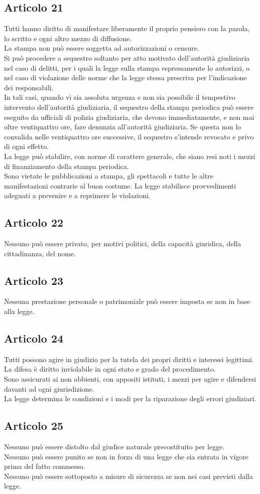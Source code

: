 \documentclass{article}
\newcommand{\articolo}[1]{
	\subsection*{Articolo #1}
}
\begin{document}
\articolo{21}
Tutti hanno diritto di manifestare liberamente il proprio pensiero con la parola, lo scritto e ogni altro mezzo di diffusione.\\
La stampa non può essere soggetta ad autorizzazioni o censure.\\
Si può procedere a sequestro soltanto per atto motivato dell’autorità giudiziaria nel caso di delitti, per i quali la legge sulla stampa espressamente lo autorizzi, o nel caso di violazione delle norme che la legge stessa prescriva per l’indicazione dei responsabili.\\
In tali casi, quando vi sia assoluta urgenza e non sia possibile il tempestivo intervento dell’autorità giudiziaria, il sequestro della stampa periodica può essere eseguito da ufficiali di polizia giudiziaria, che devono immediatamente, e non mai oltre ventiquattro ore, fare denunzia all’autorità giudiziaria. Se questa non lo convalida nelle ventiquattro ore successive, il sequestro s’intende revocato e privo di ogni effetto.\\
La legge può stabilire, con norme di carattere generale, che siano resi noti i mezzi di finanziamento della stampa periodica.\\
Sono vietate le pubblicazioni a stampa, gli spettacoli e tutte le altre manifestazioni contrarie al buon costume. La legge stabilisce provvedimenti adeguati a prevenire e a reprimere le violazioni.

\articolo{22}
Nessuno può essere privato, per motivi politici, della capacità giuridica, della cittadinanza, del nome.

\articolo{23}
Nessuna prestazione personale o patrimoniale può essere imposta se non in base alla legge.

\articolo{24}
Tutti possono agire in giudizio per la tutela dei propri diritti e interessi legittimi.\\
La difesa è diritto inviolabile in ogni stato e grado del procedimento.\\
Sono assicurati ai non abbienti, con appositi istituti, i mezzi per agire e difendersi davanti ad ogni giurisdizione.\\
La legge determina le condizioni e i modi per la riparazione degli errori giudiziari.

\articolo{25}
Nessuno può essere distolto dal giudice naturale precostituito per legge.\\
Nessuno può essere punito se non in forza di una legge che sia entrata in vigore prima del fatto commesso.\\
Nessuno può essere sottoposto a misure di sicurezza se non nei casi previsti dalla legge.
\end{document}
